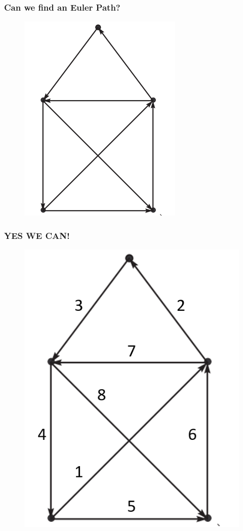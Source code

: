 \documentclass{beamer}
\begin{document}
\begin{frame}
\frametitle{Can we find an Euler Path?}
\begin{figure}[h]
\includegraphics[scale = 0.628]{pathdi.png}
\end{figure}
\end{frame}


\begin{frame}
\frametitle{YES WE CAN!}
\begin{figure}[h]
\includegraphics[scale = 0.4]{pathdisol.png}
\end{figure}
\end{frame}
\end{document}
